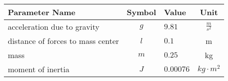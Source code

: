 \begin{tabular}{lclc}
\hline
 Parameter Name                    &  Symbol  & Value     &      Unit       \\
\hline
 acceleration due to gravity       &   $g$    & $9.81$    & $\frac{m}{s^2}$ \\
 distance of forces to mass center &   $l$    & $0.1$     &        m        \\
 mass                              &   $m$    & $0.25$    &       kg        \\
 moment of inertia                 &   $J$    & $0.00076$ & $kg \cdot m^2$  \\
\hline
\end{tabular}